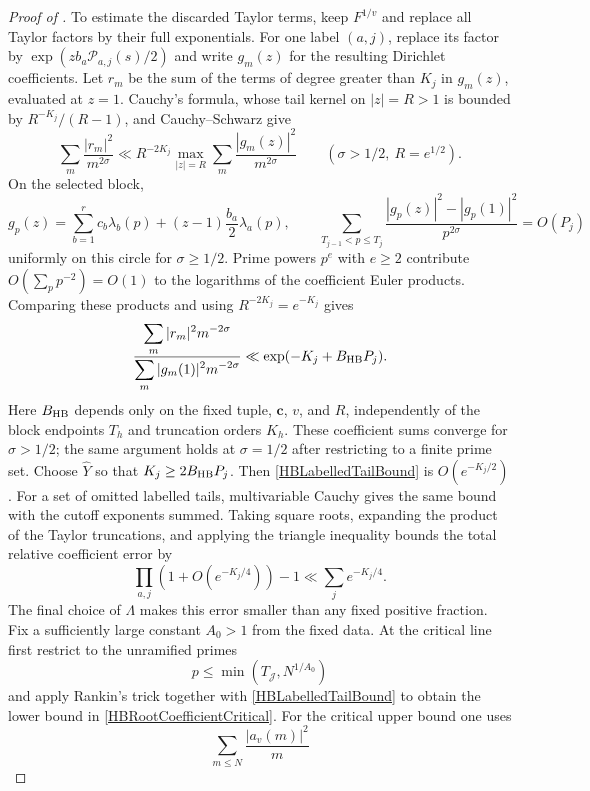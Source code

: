 \documentclass[oneside, 12pt]{amsart}
\theoremstyle{definition}
\begin{document}
{\begin{proof}[Proof of ]
			To estimate the discarded Taylor terms, keep $F^{1/v}$ and replace
			all Taylor factors by their full exponentials. For one label $(a,j)$,
			replace its factor by $\exp(zb_a\mathcal P_{a,j}(s)/2)$ and write
			$g_m(z)$ for the resulting Dirichlet coefficients. Let $r_m$ be the
			sum of the terms of degree greater than $K_j$ in $g_m(z)$, evaluated
			at $z=1$. Cauchy's formula, whose tail kernel on $|z|=R>1$ is bounded
			by $R^{-K_j}/(R-1)$, and Cauchy--Schwarz give
			\[
			\sum_m\frac{|r_m|^2}{m^{2\sigma}}
			\ll R^{-2K_j}\max_{|z|=R}
			\sum_m\frac{|g_m(z)|^2}{m^{2\sigma}}
			\qquad(\sigma>1/2,\ R=e^{1/2}).
			\]
			On the selected block,
			\[
			g_p(z)=\sum_{b=1}^r c_b\lambda_b(p)
			+(z-1)\frac{b_a}{2}\lambda_a(p),\qquad
			\sum_{T_{j-1}<p\leq T_j}
			\frac{|g_p(z)|^2-|g_p(1)|^2}{p^{2\sigma}}=O(P_j)
			\]
			uniformly on this circle for $\sigma\geq1/2$.
			Prime powers $p^e$ with $e\geq2$ contribute
			$O(\sum_p p^{-2})=O(1)$ to the logarithms of the coefficient Euler
			products. Comparing these products and using $R^{-2K_j}=e^{-K_j}$ gives
			\begin{equation}\label{HBLabelledTailBound}
				\frac{\displaystyle\sum_m |r_m|^2m^{-2\sigma}}
				{\displaystyle\sum_m |g_m(1)|^2m^{-2\sigma}}
				\ll\exp(-K_j+B_{\rm HB}P_j).
			\end{equation}
			Here $B_{\rm HB}$ depends only on the fixed tuple, $\boldsymbol c$, $v$,
			and $R$, independently of the block endpoints $T_h$ and truncation
			orders $K_h$. These coefficient sums converge for $\sigma>1/2$;
			the same argument holds at $\sigma=1/2$ after restricting to a finite
			prime set. Choose $\widehat Y$ so that $K_j\geq2B_{\rm HB}P_j$.
			Then \eqref{HBLabelledTailBound} is $O(e^{-K_j/2})$.
			For a set of omitted labelled tails, multivariable Cauchy gives
			the same bound with the cutoff exponents summed. Taking square roots,
			expanding the product of the Taylor truncations, and applying the
			triangle inequality bounds the total relative coefficient error by
			\[
			\prod_{a,j}\left(1+O(e^{-K_j/4})\right)-1
			\ll\sum_j e^{-K_j/4}.
			\]
			The final choice of $\Lambda$ makes this error smaller than any fixed
			positive fraction.
			Fix a sufficiently large constant $A_0>1$ from the fixed data.
			At the critical line first restrict to the unramified primes
			\[
			p\leq\min(T_{\mathscr J},N^{1/A_0})
			\]
			and apply Rankin's trick together with \eqref{HBLabelledTailBound}
			to obtain the lower bound in \eqref{HBRootCoefficientCritical}.
			For the critical upper bound one uses
			\[
			\sum_{m\leq N}\frac{|a_v(m)|^2}{m}
\]
\end{proof}}
\end{document}
